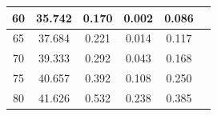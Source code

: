 \documentclass[a4paper,11pt]{article}
\begin{document}
\begin{minipage}[t]{0.5\textwidth}
\begin{tabular}{|c|c|c|c|c|c}
                    \hline
                    60 & 35.742 & 0.170 & 0.002 & 0.086 \\
                    \hline
                    65 & 37.684 & 0.221 & 0.014 & 0.117 \\
                    \hline
                    70 & 39.333 & 0.292 & 0.043 & 0.168 \\
                    \hline
                    75 & 40.657 & 0.392 & 0.108 & 0.250 \\
                    \hline
                    80 & 41.626 & 0.532 & 0.238 & 0.385 \\
                    \hline
                \end{tabular}
                \captionsetup{justification=centering, font=footnotesize}
                \vspace{10pt}
                \raggedright
    \end{minipage}
\newpage
\end{document}
